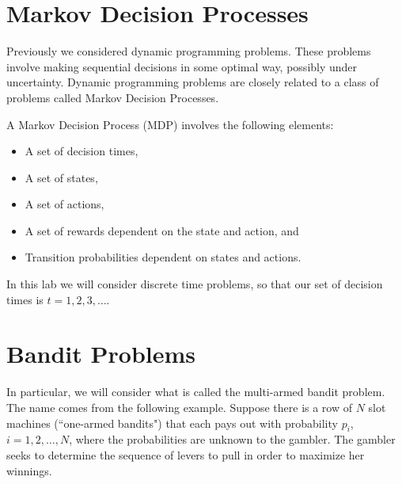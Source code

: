 
\section*{Markov Decision Processes}
Previously we considered dynamic programming problems.
These problems involve making sequential decisions in some optimal way,
possibly under uncertainty.  Dynamic programming problems are closely
related to a class of problems called Markov Decision Processes.

A Markov Decision Process (MDP) involves the following elements:

\begin{itemize}
\item   A set of decision times,
\item   A set of states,
\item   A set of actions,
\item   A set of rewards dependent on the state and action, and
\item   Transition probabilities dependent on states and actions.
\end{itemize}
In this lab we will consider discrete time problems, so that our
set of decision times is $t = 1,2,3,\ldots$.

\section*{Bandit Problems}
In particular, we will consider what is called the multi-armed bandit
problem.  The name comes from the following example.
Suppose there is a row of $N$ slot machines (``one-armed bandits")
that each pays out with probability $p_i$, $i= 1,2,\ldots,N$,
where the probabilities are unknown to the gambler.
The gambler seeks to determine the sequence of levers to pull in
order to maximize her winnings.

